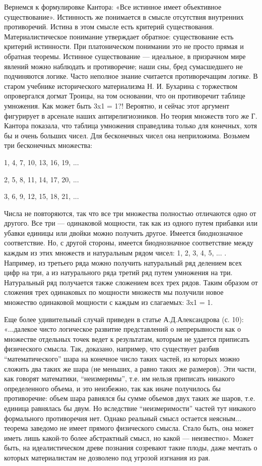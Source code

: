 Вернемся к формулировке Кантора: «Все истинное имеет объективное
существование». Истинность же понимается в смысле отсутствия
внутренних противоречий. Истина в этом смысле есть критерий
существования. Материалистическое понимание утверждает обратное:
существование есть критерий истинности. При платоническом понимании
это не просто прямая и обратная теоремы. Истинное существование ---
идеальное, в призрачном мире явлений можно наблюдать и противоречие;
наши сны, бред сумасшедшего не подчиняются логике. Часто неполное
знание считается противоречащим логике. В старом учебнике
исторического материализма Н. И. Бухарина с торжеством опровергался
догмат Троицы, на том основании, что он противоречит таблице
умножения. Как может быть 3x1 = 1?! Вероятно, и сейчас этот аргумент
фигурирует в арсенале наших антирелигиозников. Но теория множеств того
же Г. Кантора показала, что таблица умножения справедлива только для
конечных, хотя бы и очень больших чисел. Для бесконечных чисел она
неприложима. Возьмем три бесконечных множества:

1, 4, 7, 10, 13, 16, 19, ...

2, 5, 8, 11, 14, 17, 20, ...

3, 6, 9, 12, 15, 18, 21, ...

Числа не повторяются, так что все три множества полностью отличаются
одно от другого. Все три --- одинаковой мощности, так как из одного
путем прибавки или убавки единицы или двойки можно получить другое.
Имеется биоднозначное соответствие. Но, с другой стороны, имеется
биоднозначное соответствие между каждым из этих множеств и натуральным
рядом чисел: 1, 2, 3, 4, 5, ... . Например, из третьего ряда можно
получить натуральный ряд делением всех цифр на три, а из натурального
ряда третий ряд путем умножения на три. Натуральный ряд получается
также сложением всех трех рядов. Таким образом от сложения трех
одинаковых по мощности множеств мы получили новое множество одинаковой
мощности с каждым из слагаемых: 3x1 = 1.

Еще более удивительный случай приведен в статье А.Д.Александрова (с.
10): «...далекое чисто логическое развитие представлений о
непрерывности как о множестве отдельных точек ведет к результатам,
которым не удается приписать физического смысла. Так, доказано,
например, что существует разбив ``математического'' шара на конечное
число таких частей, из которых можно сложить два таких же шара (не
меньших, а равно таких же размеров). Эти части, как говорят
математики, ``неизмеримы'', т.е. им нельзя приписать никакого
определенного объема, и это неизбежно, так как иначе получилось бы
противоречие: объем шара равнялся бы сумме объемов двух таких же
шаров, т.е. единица равнялась бы двум. Но вследствие
``неизмеримости'' частей тут никакого формального противоречия нет.
Однако реальный смысл остается неясным... теорема заведомо не имеет
прямого физического смысла. Стало быть, она может иметь лишь какой-то
более абстрактный смысл, но какой --- неизвестно». Может быть, на
идеалистическом древе познания созревают такие плоды, даже мечтать о
которых материалистам не дозволено под угрозой изгнания из рая.

